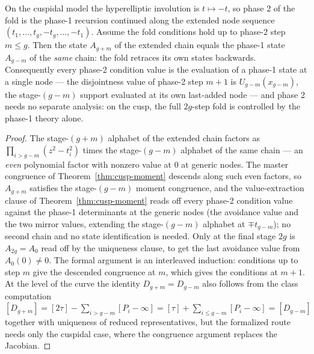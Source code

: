 \begin{lemma}
\label{lem:fold-mirror}
\leanok
On the cuspidal model the hyperelliptic involution is $t \mapsto -t$, so phase 2 of the
fold is the phase-1 recursion continued along the extended node sequence
$(t_1, \dots, t_g, -t_g, \dots, -t_1)$. Assume the fold conditions hold up to phase-2
step $m \le g$. Then the state $A_{g+m}$ of the extended chain equals the phase-1 state
$A_{g-m}$ of the \emph{same} chain: the fold retraces its own states backwards.
Consequently every phase-2 condition value is the evaluation of a phase-1 state at a
single node --- the disjointness value of phase-2 step $m+1$ is $U_{g-m}(x_{g-m})$, the
stage-$(g-m)$ support evaluated at its own last-added node --- and phase 2 needs no
separate analysis: on the cusp, the full $2g$-step fold is controlled by the phase-1
theory alone.
\end{lemma}
\begin{proof}
\leanok
The stage-$(g+m)$ alphabet of the extended chain factors as
$\prod_{i > g-m}(z^2 - t_i^2)$ times the stage-$(g-m)$ alphabet of the same chain ---
an \emph{even} polynomial factor with nonzero value at $0$ at generic nodes. The master
congruence of Theorem~\ref{thm:cusp-moment} descends along such even factors, so
$A_{g+m}$ satisfies the stage-$(g-m)$ moment congruence, and the value-extraction clause
of Theorem~\ref{thm:cusp-moment} reads off every phase-2 condition value against the
phase-1 determinants at the generic nodes (the avoidance value and the two mirror
values, extending the stage-$(g-m)$ alphabet at $\mp t_{g-m}$); no second chain and no
state identification is needed. Only at the final stage $2g$ is $A_{2g} = A_0$ read off
by the uniqueness clause, to get the last avoidance value from $A_0(0) \neq 0$. The
formal argument is an interleaved induction: conditions up to step $m$ give the
descended congruence at $m$, which gives the conditions at $m+1$. At the level of the
curve the identity $D_{g+m} = D_{g-m}$ also follows from the class computation
$[D_{g+m}] = [2\tau] - \sum_{i > g-m}[P_i - \infty] = [\tau] + \sum_{i \le g-m}
[P_i - \infty] = [D_{g-m}]$ together with uniqueness of reduced representatives, but the
formalized route needs only the cuspidal case, where the congruence argument replaces
the Jacobian.
\end{proof}

